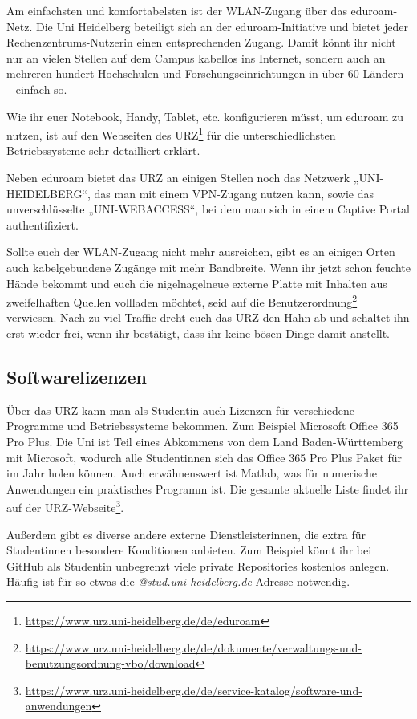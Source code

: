 Am einfachsten und komfortabelsten ist der WLAN-Zugang über das e\-du\-roam-Netz. Die Uni Heidelberg beteiligt sich an der eduroam-Initiative und bietet jeder Rechenzentrums-Nutzerin einen entsprechenden Zugang. Damit könnt ihr nicht nur an vielen Stellen auf dem Campus kabellos ins Internet, sondern auch an mehreren hundert Hochschulen und Forschungseinrichtungen in über 60 Ländern – einfach so.

Wie ihr euer Notebook, Handy, Tablet, etc. konfigurieren müsst, um eduroam zu nutzen, ist auf den Webseiten des URZ\footnote{\url{https://www.urz.uni-heidelberg.de/de/eduroam}} für die unterschiedlichsten Betriebssysteme sehr detailliert erklärt.

Neben eduroam bietet das URZ an einigen Stellen noch das Netzwerk „UNI-HEIDELBERG“, das man mit einem VPN-Zugang nutzen kann, sowie das unverschlüsselte „UNI-WEBACCESS“, bei dem man sich in einem Captive Portal authentifiziert.

Sollte euch der WLAN-Zugang nicht mehr ausreichen, gibt es an einigen Orten auch kabelgebundene Zugänge mit mehr Bandbreite. Wenn ihr jetzt schon feuchte Hände bekommt und euch die nigelnagelneue externe Platte mit Inhalten aus zweifelhaften Quellen vollladen möchtet, seid auf die Benutzerordnung\footnote{\url{https://www.urz.uni-heidelberg.de/de/dokumente/verwaltungs-und-benutzungsordnung-vbo/download}} verwiesen. Nach zu viel Traffic dreht euch das \gls{URZ} den Hahn ab und schaltet ihn erst wieder frei, wenn ihr bestätigt, dass ihr keine bösen Dinge damit anstellt.

\subsection{Softwarelizenzen}

Über das URZ kann man als Studentin auch Lizenzen für verschiedene Programme und Betriebssysteme bekommen. Zum Beispiel Microsoft Office 365 Pro Plus. Die Uni ist Teil eines Abkommens von dem Land Baden-Württemberg mit Microsoft, wodurch alle Studentinnen sich das Office 365 Pro Plus Paket für  im Jahr holen können. Auch erwähnenswert ist Matlab, was für numerische Anwendungen ein praktisches Programm ist. Die gesamte aktuelle Liste findet ihr auf der URZ-Webseite\footnote{\url{https://www.urz.uni-heidelberg.de/de/service-katalog/software-und-anwendungen}}.

Außerdem gibt es diverse andere externe Dienstleisterinnen, die extra für Studentinnen besondere Konditionen anbieten. Zum Beispiel könnt ihr bei GitHub als Studentin unbegrenzt viele private Repositories kostenlos anlegen. Häufig ist für so etwas die \emph{@stud.uni-heidelberg.de}-Adresse notwendig.
